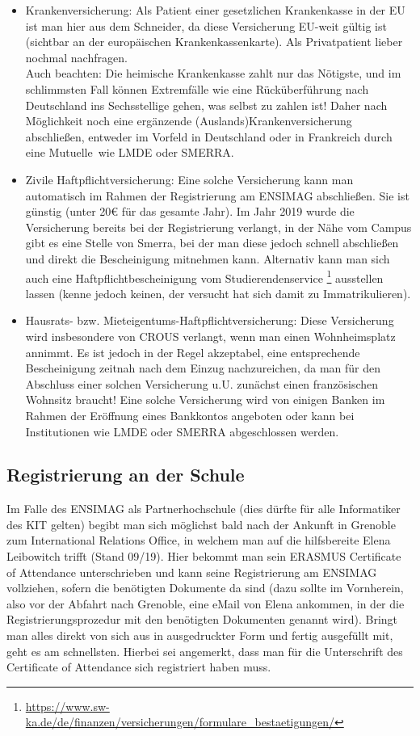 \documentclass[11pt,a4paper]{article}
\begin{document}
	\begin{itemize}
		\item Krankenversicherung: Als Patient einer gesetzlichen Krankenkasse in der EU ist man hier aus dem Schneider, da diese Versicherung EU-weit gültig ist (sichtbar an der europäischen Krankenkassenkarte). Als Privatpatient lieber nochmal nachfragen.\\
		Auch beachten: Die heimische Krankenkasse zahlt nur das Nötigste, und im schlimmsten Fall können Extremfälle wie eine Rücküberführung nach Deutschland ins Sechsstellige gehen, was selbst zu zahlen ist! Daher nach Möglichkeit noch eine ergänzende (Auslands)Krankenversicherung abschließen, entweder im Vorfeld in Deutschland oder in Frankreich durch eine \glqq Mutuelle\grqq\ wie LMDE oder SMERRA.
  \item Zivile Haftpflichtversicherung: Eine solche Versicherung kann man automatisch im Rahmen der Registrierung am ENSIMAG abschließen. Sie ist günstig (unter 20€ für das gesamte Jahr). Im Jahr 2019 wurde die Versicherung bereits bei der Registrierung verlangt, in der Nähe vom Campus gibt es eine Stelle von Smerra, bei der man diese jedoch schnell abschließen und direkt die Bescheinigung mitnehmen kann. Alternativ kann man sich auch eine Haftpflichtbescheinigung vom Studierendenservice \footnote{\url{https://www.sw-ka.de/de/finanzen/versicherungen/formulare_bestaetigungen/}} ausstellen lassen (kenne jedoch keinen, der versucht hat sich damit zu Immatrikulieren).
		\item Hausrats- bzw. Mieteigentums-Haftpflichtversicherung: Diese Versicherung wird insbesondere von CROUS verlangt, wenn man einen Wohnheimsplatz annimmt. Es ist jedoch in der Regel akzeptabel, eine entsprechende Bescheinigung zeitnah nach dem Einzug nachzureichen, da man für den Abschluss einer solchen Versicherung u.U. zunächst einen französischen Wohnsitz braucht! Eine solche Versicherung wird von einigen Banken im Rahmen der Eröffnung eines Bankkontos angeboten oder kann bei Institutionen wie LMDE oder SMERRA abgeschlossen werden.
	\end{itemize}
	
	\subsection{Registrierung an der Schule}
	
  Im Falle des ENSIMAG als Partnerhochschule (dies dürfte für alle Informatiker des KIT gelten) begibt man sich möglichst bald nach der Ankunft in Grenoble zum International Relations Office, in welchem man auf die hilfsbereite Elena Leibowitch trifft (Stand 09/19). Hier bekommt man sein ERASMUS Certificate of Attendance unterschrieben und kann seine Registrierung am ENSIMAG vollziehen, sofern die benötigten Dokumente da sind (dazu sollte im Vornherein, also vor der Abfahrt nach Grenoble, eine eMail von Elena ankommen, in der die Registrierungsprozedur mit den benötigten Dokumenten genannt wird). Bringt man alles direkt von sich aus in ausgedruckter Form und fertig ausgefüllt mit, geht es am schnellsten. Hierbei sei angemerkt, dass man für die Unterschrift des Certificate of Attendance sich registriert haben muss.
	
\end{document}
